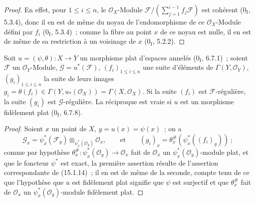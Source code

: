 \begin{proof}
En effet, pour $1\leq i\leq n$, le $\mathcal{O}_X$-Module
$\mathscr{F}/(\sum_{j=1}^{i-1}f_j\mathscr{F})$ est cohérent
($0_{\mathrm I}$, 5.3.4), donc il en est de même du noyau de
l'endomorphisme de ce $\mathcal{O}_X$-Module défini par $f_i$
($0_{\mathrm I}$, 5.3.4)~; comme la fibre au point $x$ de ce noyau est nulle,
il en est de même de sa restriction à un voisinage de $x$
($0_{\mathrm I}$, 5.2.2).
\end{proof}

\begin{proposition}[15.2.5]
\label{0.15.2.5-fr}
Soit $u=(\psi,\theta):X\to Y$ un morphisme plat d'espaces annelés
($0_{\mathrm I}$, 6.7.1)~; soient $\mathscr{F}$ un
$\mathcal{O}_Y$-Module, $\mathscr{G}=u^*(\mathscr{F})$,
$(f_i)_{1\leq i\leq n}$ une suite d'éléments de
$\Gamma(Y,\mathcal{O}_Y)$, $(g_i)_{1\leq i\leq n}$ la suite de leurs images
$g_i=\theta(f_i)\in\Gamma(Y,u_*(\mathcal{O}_X))=\Gamma(X,\mathcal{O}_X)$. Si
la suite $(f_i)$ est $\mathscr{F}$-régulière, la suite $(g_i)$ est
$\mathscr{G}$-régulière. La réciproque est vraie si $u$ est un morphisme
fidèlement plat ($0_{\mathrm I}$, 6.7.8).
\end{proposition}

\begin{proof}
Soient $x$ un point de $X$, $y=u(x)=\psi(x)$~; on a
\[
  \mathscr{G}_x=\psi_x^*(\mathscr{F}_y)
  \otimes_{\psi_x^*(\mathcal{O}_y)}\mathcal{O}_x,
  \qquad\text{et}\qquad
  (g_i)_x=\theta_x^\#(\psi_x^*((f_i)_y))~;
\]
comme par hypothèse
$\theta_x^\#:\psi_x^*(\mathcal{O}_y)\to\mathcal{O}_x$ fait de
$\mathcal{O}_x$ un $\psi_x^*(\mathcal{O}_y)$-module plat, et que le foncteur
$\psi^*$ est exact, la première assertion résulte de l'assertion correspondante
de (15.1.14)~; il en est de même de la seconde, compte tenu de ce que
l'hypothèse que $u$ est fidèlement plat signifie que $\psi$ est surjectif et
que $\theta_x^\#$ fait de $\mathcal{O}_x$ un
$\psi_x^*(\mathcal{O}_y)$-module fidèlement plat.
\end{proof}
